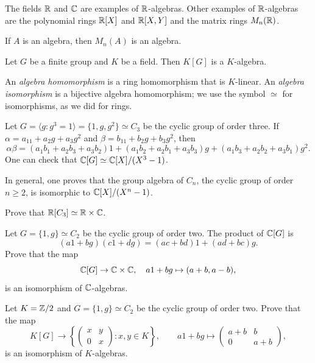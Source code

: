 The fields $\mathbb{R}$ and $\mathbb{C}$ are examples of $\mathbb{R}$-algebras. 
Other examples of $\mathbb{R}$-algebras are the 
polynomial rings $\mathbb{R}[X]$ and $\mathbb{R}[X,Y]$ and the matrix rings $M_n(\mathbb{R})$.  

\begin{example}
	If $A$ is an algebra, then $M_n(A)$ is an algebra.	
\end{example}

\begin{example}
    Let $G$ be a finite group and $K$ be a field. Then $K[G]$ is a $K$-algebra. 
\end{example}

An \emph{algebra homomorphism} is a ring homomorphism that is $K$-linear. An
\emph{algebra isomorphism} is a bijective algebra homomorphism; we use the
symbol $\simeq$ for isomorphisms, as we did for rings.

\begin{example}
	Let $G=\langle g:g^3=1\rangle=\{1,g,g^2\}\simeq C_3$ be the cyclic group of order three. 
	If $\alpha=a_11+a_2g+a_3g^2$ and $\beta=b_11+b_2g+b_3g^2$, then
	\[
		\alpha\beta=(a_1b_1+a_2b_3+a_3b_2)1+(a_1b_2+a_2b_1+a_3b_3)g+(a_1b_3+a_2b_2+a_3b_1)g^2.
	\]
	One can check that $\mathbb{C}[G]\simeq\mathbb{C}[X]/(X^3-1)$. 
\end{example}

In general, one proves that the group algebra of $C_n$, the cyclic group of order $n\geq2$, 
is isomorphic to $\mathbb{C}[X]/(X^n-1)$.

\begin{exercise}
\label{xca:RC3}
	Prove that $\mathbb{R}[C_3]\simeq\mathbb{R}\times\mathbb{C}$. 	
\end{exercise}

\begin{exercise}
	Let $G=\{1,g\}\simeq C_2$ be the cyclic group of order two. The product
	of $\mathbb{C}[G]$ is 
	\[
	(a1+bg)(c1+dg)=(ac+bd)1+(ad+bc)g.
	\]
	Prove that the map 
 \[
 \mathbb{C}[G]\to \mathbb{C}\times \mathbb{C},\quad a1+bg\mapsto (a+b,a-b),
 \]
	is an isomorphism of $\mathbb{C}$-algebras. 
\end{exercise}

\begin{exercise}
	Let $K=\mathbb{Z}/2$ and $G=\{1,g\}\simeq C_2$ be the cyclic group of order two. 
	Prove that the map 
\[
K[G]\longrightarrow
\left\{
\begin{pmatrix}
x&y\\
0&x
\end{pmatrix}
:x,y\in K
\right\},
\qquad
a1+bg\longmapsto
\begin{pmatrix}
a+b&b\\
0&a+b
\end{pmatrix},
\]
    is an isomorphism of $K$-algebras. 
\end{exercise}

